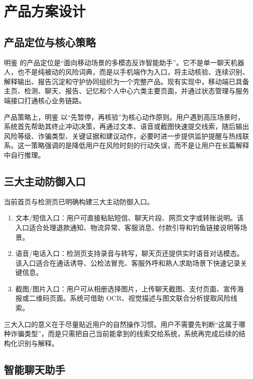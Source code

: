 \documentclass[UTF8,a4paper,12pt]{ctexart}
\begin{document}
\section{产品方案设计}

\subsection{产品定位与核心策略}

明鉴 的产品定位是“面向移动场景的多模态反诈智能助手”。它不是单一聊天机器人，也不是纯被动的风险词典，而是以手机端作为入口，将主动核验、连续识别、解释输出、报告沉淀和守护协同组织为一个完整产品。现有实现中，移动端已具备主页、检测、聊天、报告、记忆和个人中心六类主要页面，并通过状态管理与服务端接口打通核心业务链路。

产品策略上，明鉴 以“先暂停，再核验”为核心动作原则。用户遇到高压场景时，系统首先帮助其终止冲动决策，再通过文本、语音或截图快速提交线索，随后输出风险等级、诈骗类型、关键证据和建议动作，必要时进一步提供监护提醒与热线联系。这一策略强调的是降低用户在风险时刻的行动失误，而不是让用户在长篇解释中自行推理。

\subsection{三大主动防御入口}

当前首页与检测页已明确构建三大主动防御入口。

\begin{enumerate}
    \item 文本/短信入口：用户可直接粘贴短信、聊天片段、网页文字或转账说明。该入口适合处理退款通知、物流异常、客服消息、付款引导和钓鱼链接说明等场景。
    \item 语音/电话入口：检测页支持录音与转写，聊天页还提供实时语音对话模态。该入口适合在通话诱导、公检法冒充、客服外呼和熟人求助场景下快速记录关键信息。
    \item 截图/图片入口：用户可从相册选择图片，上传聊天截图、支付页面、宣传海报或二维码页面。系统可借助 OCR、视觉描述与图文联合分析提取风险线索。
\end{enumerate}

三大入口的意义在于尽量贴近用户的自然操作习惯。用户不需要先判断“这属于哪种诈骗类型”，而是只需把自己当前能拿到的线索交给系统，系统再完成后续的结构化识别与解释。

\subsection{智能聊天助手}
\end{document}
